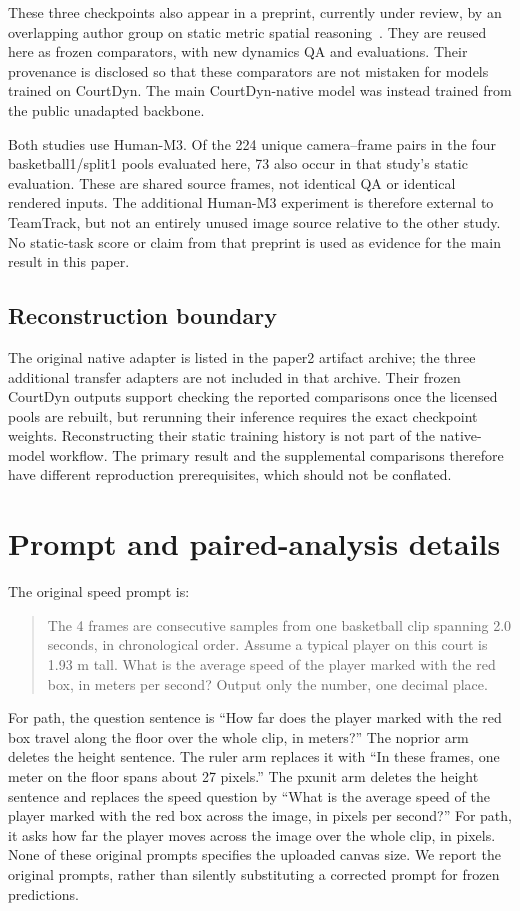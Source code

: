\documentclass[11pt]{article}
\begin{document}
These three checkpoints also appear in a preprint, currently under review,
by an overlapping author group on static metric spatial
reasoning~\cite{ji2026calibration}. They are reused here as frozen comparators,
with new dynamics QA and evaluations. Their provenance is disclosed so that
these comparators are not mistaken for models trained on CourtDyn. The main
CourtDyn-native model was instead trained from the public unadapted backbone.

Both studies use Human-M3. Of the 224 unique camera--frame pairs in the four
basketball1/split1 pools evaluated here, 73 also occur in that study's static
evaluation. These are shared source frames, not identical QA or identical
rendered inputs. The additional Human-M3 experiment is therefore external to
TeamTrack, but not an entirely unused image source relative to the other
study. No static-task score or claim from that preprint is used as
evidence for the main result in this paper.

\subsection{Reconstruction boundary}

The original native adapter is listed in the paper2 artifact archive; the three
additional transfer adapters are not included in that archive. Their frozen
CourtDyn outputs support checking the reported comparisons once the licensed
pools are rebuilt, but rerunning their inference requires the exact checkpoint
weights. Reconstructing their static training history is not part of the
native-model workflow. The primary result and the supplemental comparisons
therefore have different reproduction prerequisites, which should not be
conflated.

\section{Prompt and paired-analysis details}
\label{app:paired}

The original speed prompt is:
\begin{quote}\small
The 4 frames are consecutive samples from one basketball clip spanning
2.0 seconds, in chronological order. Assume a typical player on this court is
1.93 m tall. What is the average speed of the player marked with the red box,
in meters per second? Output only the number, one decimal place.
\end{quote}
For path, the question sentence is ``How far does the player marked with the
red box travel along the floor over the whole clip, in meters?'' The noprior
arm deletes the height sentence. The ruler arm replaces it with ``In these
frames, one meter on the floor spans about 27 pixels.'' The pxunit arm deletes
the height sentence and replaces the speed question by ``What is the average
speed of the player marked with the red box across the image, in pixels per
second?'' For path, it asks how far the player moves across the image over the
whole clip, in pixels. None of these original prompts specifies the uploaded
canvas size. We report the original prompts, rather than silently substituting
a corrected prompt for frozen predictions.
\end{document}

